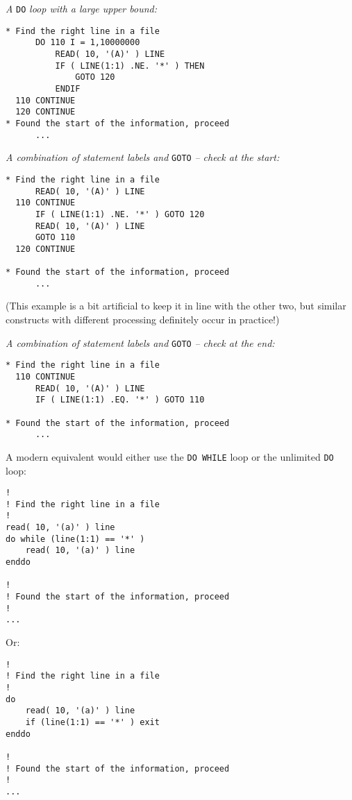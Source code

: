\vspace{\baselineskip}
\noindent \emph{A} \verb+DO+ \emph{loop with a large upper bound:}
\begin{verbatim}
* Find the right line in a file
      DO 110 I = 1,10000000
          READ( 10, '(A)' ) LINE
          IF ( LINE(1:1) .NE. '*' ) THEN
              GOTO 120
          ENDIF
  110 CONTINUE
  120 CONTINUE
* Found the start of the information, proceed
      ...
\end{verbatim}

\vspace{\baselineskip}
\noindent \emph{A combination of statement labels and} \verb+GOTO+ \emph{-- check at the start:}
\begin{verbatim}
* Find the right line in a file
      READ( 10, '(A)' ) LINE
  110 CONTINUE
      IF ( LINE(1:1) .NE. '*' ) GOTO 120
      READ( 10, '(A)' ) LINE
      GOTO 110
  120 CONTINUE

* Found the start of the information, proceed
      ...
\end{verbatim}
\noindent (This example is a bit artificial to keep it in line with the other two,
but similar constructs with different processing definitely occur in practice!)

\vspace{\baselineskip}
\noindent \emph{A combination of statement labels and} \verb+GOTO+ \emph{-- check at the end:}
\begin{verbatim}
* Find the right line in a file
  110 CONTINUE
      READ( 10, '(A)' ) LINE
      IF ( LINE(1:1) .EQ. '*' ) GOTO 110

* Found the start of the information, proceed
      ...
\end{verbatim}

A modern equivalent would either use the \verb+DO WHILE+ loop or the unlimited
\verb+DO+ loop:
%
\begin{verbatim}
!
! Find the right line in a file
!
read( 10, '(a)' ) line
do while (line(1:1) == '*' )
    read( 10, '(a)' ) line
enddo

!
! Found the start of the information, proceed
!
...
\end{verbatim}
%
Or:
%
\begin{verbatim}
!
! Find the right line in a file
!
do
    read( 10, '(a)' ) line
    if (line(1:1) == '*' ) exit
enddo

!
! Found the start of the information, proceed
!
...
\end{verbatim}

